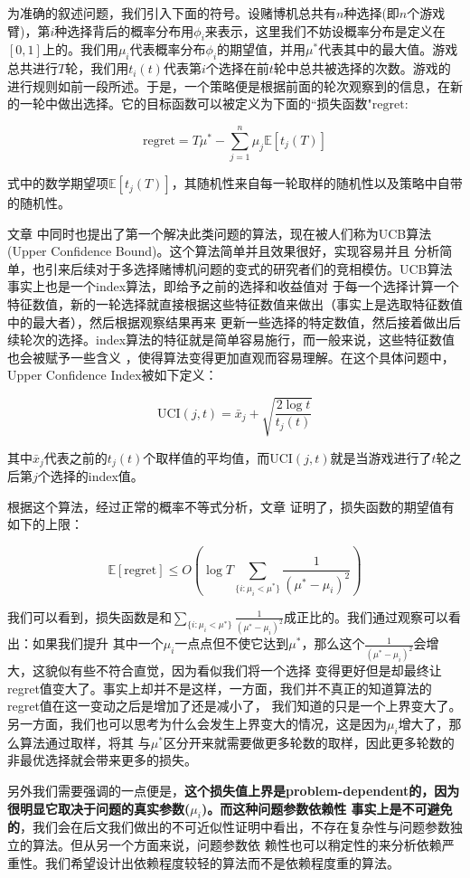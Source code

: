\documentclass[bachelor]{thuthesis}
\begin{document}
为准确的叙述问题，我们引入下面的符号。设赌博机总共有$n$种选择(即$n$个游戏臂)，第$i$种选择背后的概率分布用$\phi_i$来表示，这里我们不妨设概率分布是定义在$[0,1]$上的。我们用$\mu_i$代表概率分布$\phi_i$的期望值，并用$\mu^{*}$代表其中的最大值。游戏总共进行$T$轮，我们用$t_{i}(t)$代表第$i$个选择在前$t$轮中总共被选择的次数。游戏的进行规则如前一段所述。于是，一个策略便是根据前面的轮次观察到的信息，在新的一轮中做出选择。它的目标函数可以被定义为下面的``损失函数"$\text{regret}$:

\[\text{regret}=T\mu^*-\sum_{j=1}^{n}\mu_j \mathbb{E}[t_j(T)]\]

式中的数学期望项$\mathbb{E}[t_j(T)]$，其随机性来自每一轮取样的随机性以及策略中自带的随机性。

文章
\cite{finite}
中同时也提出了第一个解决此类问题的算法，现在被人们称为UCB算法(Upper Confidence Bound)。这个算法简单并且效果很好，实现容易并且
分析简单，也引来后续对于多选择赌博机问题的变式的研究者们的竞相模仿。UCB算法事实上也是一个index算法，即给予之前的选择和收益值对
于每一个选择计算一个特征数值，新的一轮选择就直接根据这些特征数值来做出（事实上是选取特征数值中的最大者），然后根据观察结果再来
更新一些选择的特定数值，然后接着做出后续轮次的选择。index算法的特征就是简单容易施行，而一般来说，这些特征数值也会被赋予一些含义
，使得算法变得更加直观而容易理解。在这个具体问题中，Upper Confidence Index被如下定义：

\[\text{UCI}(j,t)=\bar{x}_j+\sqrt{\frac{2\log t}{t_j(t)}}\]

其中$\bar{x}_j$代表之前的$t_j(t)$个取样值的平均值，而$\text{UCI}(j,t)$就是当游戏进行了$t$轮之后第$j$个选择的index值。

根据这个算法，经过正常的概率不等式分析，文章
\cite{finite}
证明了，损失函数的期望值有如下的上限：

\[\mathbb{E}[\text{regret}]\le O\left(\log T\sum_{\{i:\mu_i<\mu^*\}}\frac{1}{(\mu^*-\mu_i)^2}\right)\]

我们可以看到，损失函数是和$\sum_{\{i:\mu_i<\mu^*\}}\frac{1}{(\mu^*-\mu_i)^2}$成正比的。我们通过观察可以看出：如果我们提升
其中一个$\mu_i$一点点但不使它达到$\mu^*$，那么这个$\frac{1}{(\mu^*-\mu_i)^2}$会增大，这貌似有些不符合直觉，因为看似我们将一个选择
变得更好但是却最终让regret值变大了。事实上却并不是这样，一方面，我们并不真正的知道算法的regret值在这一变动之后是增加了还是减小了，
我们知道的只是一个上界变大了。另一方面，我们也可以思考为什么会发生上界变大的情况，这是因为$\mu_i$增大了，那么算法通过取样，将其
与$\mu^*$区分开来就需要做更多轮数的取样，因此更多轮数的非最优选择就会带来更多的损失。

另外我们需要强调的一点便是，\textbf{这个损失值上界是problem-dependent的，因为很明显它取决于问题的真实参数($\mu_i$)。而这种问题参数依赖性
事实上是不可避免的}，我们会在后文我们做出的不可近似性证明中看出，不存在复杂性与问题参数独立的算法。但从另一个方面来说，问题参数依
赖性也可以稍定性的来分析依赖严重性。我们希望设计出依赖程度较轻的算法而不是依赖程度重的算法。
\end{document}
